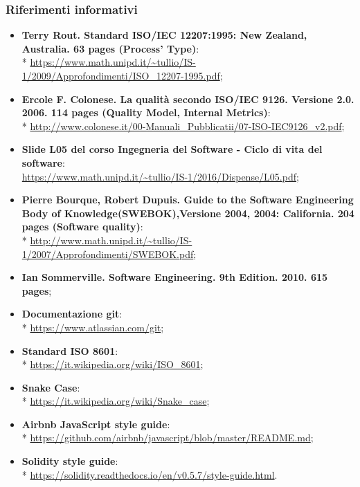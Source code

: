 \subsubsection{Riferimenti informativi}
\begin{itemize}
	\item \textbf{Terry Rout. Standard ISO/IEC 12207:1995: New Zealand, Australia. 63 pages (Process' Type)}:\\* 
	\url{https://www.math.unipd.it/~tullio/IS-1/2009/Approfondimenti/ISO_12207-1995.pdf};
	\item \textbf{Ercole F. Colonese. La qualità secondo ISO/IEC 9126. Versione 2.0. 2006. 114 pages (Quality Model, Internal Metrics)}: \\*
	\url{http://www.colonese.it/00-Manuali_Pubblicatii/07-ISO-IEC9126_v2.pdf};
	\item \textbf{Slide L05 del corso Ingegneria del Software - Ciclo di vita 
	del software}:\\ 
		\url{https://www.math.unipd.it/~tullio/IS-1/2016/Dispense/L05.pdf};
	\item \textbf{Pierre Bourque, Robert Dupuis. Guide to the Software Engineering Body of Knowledge(SWEBOK),Versione 2004, 2004: California. 204 pages (Software quality)}: \\*
		\url{http://www.math.unipd.it/~tullio/IS-1/2007/Approfondimenti/SWEBOK.pdf};
	\item \textbf{Ian Sommerville. Software Engineering. 9th Edition. 2010. 615 pages};
	\item \textbf{Documentazione git}: \\*
		\url{https://www.atlassian.com/git};
	\item \textbf{Standard ISO 8601}: \\*
		\url{https://it.wikipedia.org/wiki/ISO_8601};
	\item \textbf{Snake Case}\glo: \\*
		\url{https://it.wikipedia.org/wiki/Snake_case};
	\item \textbf{Airbnb JavaScript style guide}: \\*
		\url{https://github.com/airbnb/javascript/blob/master/README.md};
	\item \textbf{Solidity style guide}: \\*
		\url{https://solidity.readthedocs.io/en/v0.5.7/style-guide.html}.
	
	
	
	
\end{itemize}
